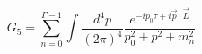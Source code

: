 \begin{equation}
G_5= \sum_{n=0}^{\Gamma -1} \int\frac{d^4p}{(2\pi)^4}\frac{e^{-ip_0\tau 
+i\vec p \cdot \vec L}}{p_0^2+p^2+m_n^2}
\end{equation}

